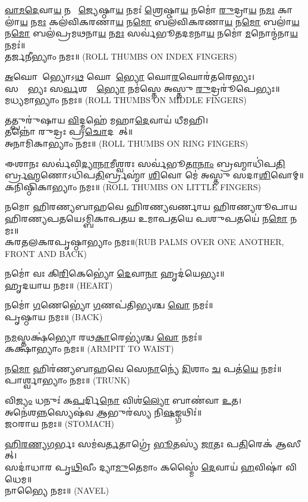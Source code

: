 \ul{𑌵𑌾}\ul{𑌮}\ul{𑌦𑍇}𑌵𑌾\ul{𑌯} 𑌨𑌮𑍋᳚ \ul{𑌜𑍍𑌯𑍇}𑌷𑍍𑌠𑌾\ul{𑌯} 𑌨𑌮𑌃॑ \ul{𑌶𑍍𑌰𑍇}𑌷𑍍𑌠𑌾\ul{𑌯} 𑌨𑌮𑍋॑ \ul{𑌰𑍁}𑌦𑍍𑌰𑌾\ul{𑌯} 𑌨\ul{𑌮𑌃} 𑌕𑌾𑌲𑌾॑\ul{𑌯} 𑌨\ul{𑌮𑌃} 𑌕𑌲॑𑌵𑌿𑌕𑌰𑌣𑌾\ul{𑌯} 𑌨\ul{𑌮𑍋} 𑌬𑌲॑𑌵𑌿𑌕𑌰𑌣𑌾\ul{𑌯} 𑌨\ul{𑌮𑍋} 𑌬𑌲𑌾॑\ul{𑌯} 𑌨\ul{𑌮𑍋} 𑌬𑌲॑𑌪𑍍𑌰𑌮𑌥𑌨𑌾\ul{𑌯} 𑌨\ul{𑌮𑌃} 𑌸𑌰𑍍𑌵॑𑌭𑍂𑌤𑌦𑌮𑌨𑌾\ul{𑌯} 𑌨𑌮𑍋॑ \ul{𑌮}𑌨𑍋𑌨𑍍𑌮॑𑌨𑌾\ul{𑌯} 𑌨𑌮𑌃॑॥\\
𑌤𑌰𑍍𑌜𑌨𑍀𑌭𑍍𑌯𑌾𑌂 𑌨𑌮𑌃॥ {\scriptsize (ROLL THUMBS ON INDEX FINGERS)}

\ul{𑌅}𑌘𑍋𑌰𑍇᳚𑌭𑍍𑌯𑍋𑌽\ul{𑌥} 𑌘𑍋𑌰𑍇᳚\ul{𑌭𑍍𑌯𑍋} 𑌘𑍋\ul{𑌰}𑌘𑍋𑌰॑𑌤𑌰𑍇𑌭𑍍𑌯𑌃।\\
𑌸𑌰𑍍𑌵𑍇᳚𑌭𑍍𑌯𑌃 𑌸\ul{𑌰𑍍𑌵}𑌶𑌰𑍍𑌵𑍇᳚\ul{𑌭𑍍𑌯𑍋} 𑌨𑌮॑𑌸𑍍𑌤𑍇 𑌅𑌸𑍍𑌤𑍁 \ul{𑌰𑍁}𑌦𑍍𑌰𑌰𑍂॑𑌪𑍇𑌭𑍍𑌯𑌃॥\\
𑌮𑌧𑍍𑌯𑌮𑌾𑌭𑍍𑌯𑌾𑌂 𑌨𑌮𑌃॥ {\scriptsize (ROLL THUMBS ON MIDDLE FINGERS)}

𑌤𑌤𑍍𑌪𑍁𑌰𑍁॑𑌷𑌾𑌯 \ul{𑌵𑌿}𑌦𑍍𑌮𑌹𑍇॑ 𑌮𑌹𑌾\ul{𑌦𑍇}𑌵𑌾𑌯॑ 𑌧𑍀𑌮𑌹𑌿।\\
𑌤𑌨𑍍𑌨𑍋॑ 𑌰𑍁𑌦𑍍𑌰𑌃 𑌪𑍍𑌰\ul{𑌚𑍋}𑌦𑌯𑌾᳚𑌤𑍍॥\\
𑌅𑌨𑌾𑌮𑌿𑌕𑌾𑌭𑍍𑌯𑌾𑌂 𑌨𑌮𑌃॥ {\scriptsize (ROLL THUMBS ON RING FINGERS)}

𑌈𑌶𑌾𑌨𑌃 𑌸𑌰𑍍𑌵॑𑌵𑌿\ul{𑌦𑍍𑌯𑌾}\ul{𑌨𑌾}𑌮𑍀𑌶𑍍𑌵𑌰𑌃 𑌸𑌰𑍍𑌵॑𑌭𑍂\ul{𑌤𑌾}\ul{𑌨𑌾𑌂} 𑌬𑍍𑌰𑌹𑍍𑌮𑌾𑌧𑌿॑𑌪\ul{𑌤𑌿}𑌰𑍍𑌬𑍍𑌰\ul{𑌹𑍍𑌮}𑌣𑍋\-𑌽𑌧𑌿॑𑌪\ul{𑌤𑌿}𑌰𑍍𑌬𑍍𑌰𑌹𑍍𑌮𑌾॑ \ul{𑌶𑌿}𑌵𑍋 𑌮𑍇॑ 𑌅𑌸𑍍𑌤𑍁 𑌸𑌦𑌾\ul{𑌶𑌿}𑌵𑍋𑌮𑍍॥\\
𑌕𑌨𑌿𑌷𑍍𑌠𑌿𑌕𑌾𑌭𑍍𑌯𑌾𑌂 𑌨𑌮𑌃॥ {\scriptsize (ROLL THUMBS ON LITTLE FINGERS)}

𑌨𑌮𑍋 𑌹𑌿𑌰𑌣𑍍𑌯𑌬𑌾𑌹𑌵𑍇 𑌹𑌿𑌰𑌣𑍍𑌯𑌵𑌰𑍍𑌣𑌾𑌯 𑌹𑌿𑌰𑌣𑍍𑌯𑌰𑍂𑌪𑌾𑌯 𑌹𑌿𑌰𑌣𑍍𑌯𑌪𑌤𑌯𑍇\-𑌽𑌮𑍍𑌬𑌿𑌕𑌾𑌪𑌤𑌯 𑌉𑌮𑌾𑌪𑌤𑌯𑍇 𑌪𑌶𑍁𑌪𑌤𑌯𑍇॑ 𑌨\ul{𑌮𑍋} 𑌨𑌮𑌃॥\\
𑌕𑌰𑌤𑌲𑌕𑌰𑌪𑍃𑌷𑍍𑌠𑌾𑌭𑍍𑌯𑌾𑌂 𑌨𑌮𑌃॥{\scriptsize (RUB PALMS OVER ONE ANOTHER, FRONT AND BACK)}

𑌨𑌮𑍋॑ 𑌵𑌃 𑌕𑌿\ul{𑌰𑌿}𑌕𑍇𑌭𑍍𑌯𑍋॑ \ul{𑌦𑍇}𑌵𑌾\ul{𑌨𑌾}\ul{} 𑌹𑍃𑌦॑𑌯𑍇𑌭𑍍𑌯𑌃॥\\
𑌹𑍃𑌦𑌯𑌾𑌯 𑌨𑌮𑌃॥ {\scriptsize (HEART)}

𑌨𑌮𑍋॑ \ul{𑌗}𑌣𑍇𑌭𑍍𑌯𑍋॑ \ul{𑌗}𑌣𑌪॑𑌤𑌿𑌭𑍍𑌯𑌶𑍍𑌚 \ul{𑌵𑍋} 𑌨𑌮𑌃॑॥\\
𑌪𑍃𑌷𑍍𑌠𑌾𑌯 𑌨𑌮𑌃॥ {\scriptsize (BACK)}

𑌨\ul{𑌮}𑌸𑍍𑌤𑌕𑍍𑌷॑𑌭𑍍𑌯𑍋 𑌰𑌥\ul{𑌕𑌾}𑌰𑍇𑌭𑍍𑌯॑𑌶𑍍𑌚 \ul{𑌵𑍋} 𑌨𑌮𑌃॑॥\\
𑌕𑌕𑍍𑌷𑌾𑌭𑍍𑌯𑌾𑌂 𑌨𑌮𑌃॥ {\scriptsize (ARMPIT TO WAIST)}

𑌨\ul{𑌮𑍋} 𑌹𑌿𑌰॑𑌣𑍍𑌯𑌬𑌾𑌹𑌵𑍇 𑌸𑍇\ul{𑌨𑌾}𑌨𑍍𑌯𑍇॑ \ul{𑌦𑌿}𑌶𑌾𑌂 \ul{𑌚} 𑌪𑌤॑\ul{𑌯𑍇} 𑌨𑌮𑌃॑॥\\
𑌪𑌾𑌰𑍍𑌶𑍍𑌵𑌾𑌭𑍍𑌯𑌾𑌂 𑌨𑌮𑌃॥ {\scriptsize (TRUNK)}

 𑌵𑌿\ul{𑌜𑍍𑌯𑌂} 𑌧𑌨𑍁𑌃॑ 𑌕\ul{𑌪}𑌰𑍍𑌦𑌿\ul{𑌨𑍋} 𑌵𑌿𑌶॑\ul{𑌲𑍍𑌯𑍋} 𑌬𑌾𑌣॑𑌵𑌾 \ul{𑌉}𑌤।\\
 𑌅𑌨𑍇॑𑌶\ul{𑌨𑍍𑌨}𑌸𑍍𑌯𑍇𑌷॑𑌵 \ul{𑌆}𑌭𑍁𑌰॑𑌸𑍍𑌯 𑌨𑌿\ul{𑌷}𑌙𑍍𑌗𑌥𑌿𑌃॑॥\\
𑌜𑌠𑌰𑌾𑌯 𑌨𑌮𑌃॥ {\scriptsize (STOMACH)}


\ul{𑌹𑌿}\ul{𑌰}\ul{𑌣𑍍𑌯}\ul{𑌗}𑌰𑍍𑌭𑌃 𑌸𑌮॑𑌵\ul{𑌰𑍍𑌤}𑌤𑌾𑌗𑍍𑌰𑍇॑ \ul{𑌭𑍂}𑌤𑌸𑍍𑌯॑ \ul{𑌜𑌾}𑌤𑌃 𑌪\ul{𑌤𑌿}𑌰𑍇𑌕॑ 𑌆𑌸𑍀𑌤𑍍।\\
𑌸𑌦𑌾॑𑌧𑌾𑌰 𑌪𑍃\ul{𑌥𑌿}𑌵𑍀𑌂 𑌦𑍍𑌯𑌾\ul{𑌮𑍁}𑌤𑍇𑌮𑌾𑌂 𑌕𑌸𑍍𑌮𑍈॑ \ul{𑌦𑍇}𑌵𑌾𑌯॑ \ul{𑌹}𑌵𑌿𑌷𑌾॑ 𑌵𑌿𑌧𑍇𑌮॥\\
𑌨𑌾𑌭𑍍𑌯𑍈 𑌨𑌮𑌃॥ {\scriptsize (NAVEL)}

